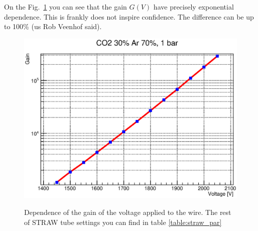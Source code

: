 \documentclass[]{article}
\begin{document}

	On the Fig.~\ref{fig:gain-voltage-dendence} you can see that the gain $G(V)$ have precisely exponential dependence. This is frankly does not inspire confidence. The difference can be up to 100\% (us Rob Veenhof\cite{garfield} said).
	
	
	
	
	
	\begin{figure}[h]
	\centering
	\includegraphics[width=\textwidth]{gain_1450_2050V}
	\label{fig:gain-voltage-dendence}	
	\caption{Dependence of the gain of the voltage applied to the wire. The rest of STRAW tube settings you can find in table \ref{table:straw_par}}
	\end{figure}
	
\end{document}
